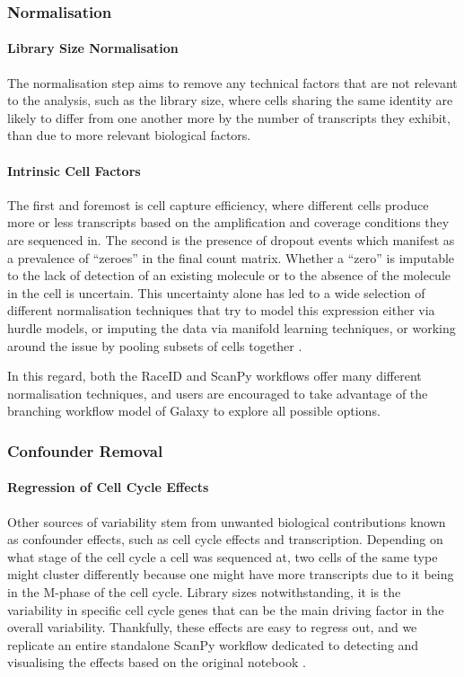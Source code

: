 \documentclass[a4paper,num-refs]{oup-contemporary}
\begin{document}
\subsubsection{Normalisation}

\paragraph{Library Size Normalisation}
The normalisation step aims to remove any technical factors that are not relevant to the analysis, such as the library size, where cells sharing the same identity are likely to differ from one another more by the number of transcripts they exhibit, than due to more relevant biological factors. 

\paragraph{Intrinsic Cell Factors}
The first and foremost is cell capture efficiency, where different cells produce more or less transcripts based on the amplification and coverage conditions they are sequenced in. The second is the presence of dropout events which manifest as a prevalence of ``zeroes'' in the final count matrix. Whether a ``zero'' is imputable to the lack of detection of an existing molecule or to the absence of the molecule in the cell is uncertain. This uncertainty alone has led to a wide selection of different normalisation techniques that try to model this expression either via hurdle models, or imputing the data via manifold learning techniques, or working around the issue by pooling subsets of cells together \citep{lun2016pooling}.

In this regard, both the RaceID and ScanPy workflows offer many different normalisation techniques, and users are encouraged to take advantage of the branching workflow model of Galaxy to explore all possible options.

\subsubsection{Confounder Removal}

\paragraph{Regression of Cell Cycle Effects}
Other sources of variability stem from unwanted biological contributions known as confounder effects, such as cell cycle effects and transcription. Depending on what stage of the cell cycle a cell was sequenced at, two cells of the same type might cluster differently because one might have more transcripts due to it being in the M-phase of the cell cycle. Library sizes notwithstanding, it is the variability in specific cell cycle genes that can be the main driving factor in the overall variability. Thankfully, these effects are easy to regress out, and we replicate an entire standalone ScanPy workflow dedicated to detecting and visualising the effects based on the original notebook \citep{scanpy3kpbmc}. 
\end{document}

